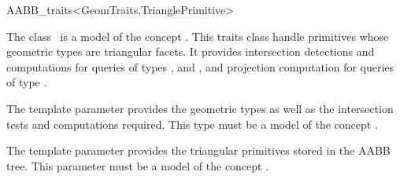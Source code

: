 \ccRefPageBegin


\begin{ccRefClass}{AABB_traits<GeomTraits,TrianglePrimitive>}  %


\ccDefinition
  
The class \ccRefName\ is a model of the concept . This traits class handle primitives whose geometric types are
triangular facets. It provides intersection detections and computations for queries of types ,  and , and projection computation for queries of type .

\ccParameters
The template parameter  provides the geometric types as well as the intersection tests and computations required.
This type must be a model of the concept .

The template parameter  provides the triangular primitives stored in the AABB tree. This parameter must be a model of the concept .




\ccTypes


\ccCreation
{}  %





\end{ccRefClass}
